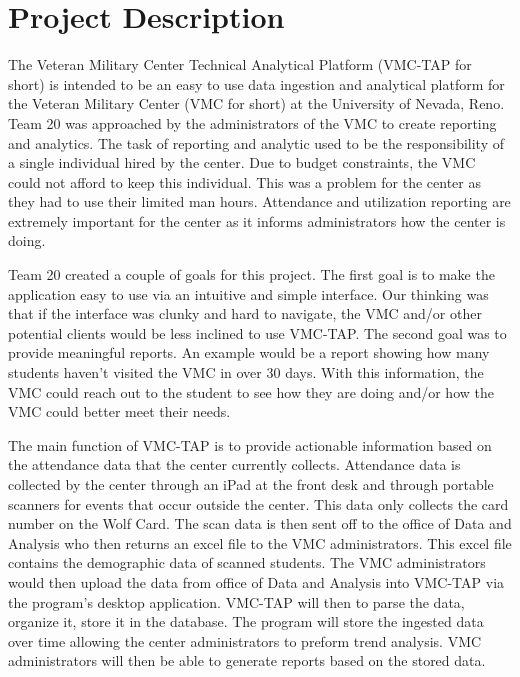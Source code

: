 \section{Project Description}
\label{sect:project_description}

The Veteran Military Center Technical Analytical Platform (VMC-TAP for short) is intended to be an easy to use data ingestion and analytical platform for the Veteran Military Center (VMC for short) at the University of Nevada, Reno. Team 20  was approached by the administrators of the VMC to create reporting and analytics. The task of reporting and analytic used to be the responsibility of a single individual hired by the center. Due to budget constraints, the VMC could not afford to keep this individual. This was a problem for the center as they had to use their limited man hours. Attendance and utilization reporting are extremely important for the center as it informs administrators how the center is doing. 

Team 20 created a couple of goals for this project. The first goal is to make the application easy to use via an intuitive and simple interface. Our thinking was that if the interface was clunky and hard to navigate, the VMC and/or other potential clients would be less inclined to use VMC-TAP. The second goal was to provide meaningful reports. An example would be a report showing how many students haven’t visited the VMC in over 30 days. With this information, the VMC could reach out to the student to see how they are doing and/or how the VMC could better meet their needs. 
	
The main function of VMC-TAP is to provide actionable information based on the attendance data that the center currently collects. Attendance data is collected by the center through an iPad at the front desk and through portable scanners for events that occur outside the center. This data only collects the card number on the Wolf Card. The scan data is then sent off to the office of Data and Analysis who then returns an excel file to the VMC administrators. This excel file  contains the demographic data of scanned students. The VMC administrators would then upload the data from office of Data and Analysis into VMC-TAP via the program’s desktop application. VMC-TAP will then to parse the data, organize it, store it in the database. The program will store the ingested data over time allowing the center administrators to preform trend analysis. VMC administrators will then be able to generate reports based on the stored data. 

